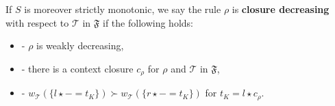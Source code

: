 \begin{definition}
    \noindent
   If $S$ is moreover strictly monotonic, we say the rule $\rho$ is
            \textbf{closure decreasing} with respect to $\mathcal{T}$ in $\mathfrak{F}$ if the following holds:
            \begin{itemize}
                \item[]- $\rho$ is weakly decreasing,
                \item[]- there is a context closure $c_\rho$ for $\rho$ and $\mathcal{T}$ in $\mathfrak{F}$,
                \item[]- $w_\mathcal{T}(\{l \mathop{\star} - \mathop{=} t_K\})  
                \mathop{\succ}  w_\mathcal{T}(\{r \mathop{\star} - \mathop{=} t_K\})$ for $t_K \mathop{=} l \mathop{\star} c_\rho$.
            \end{itemize}
\end{definition}

